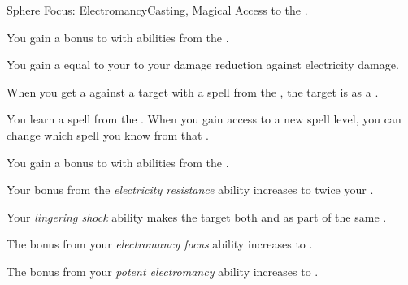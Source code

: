     \begin{feat}{Sphere Focus: Electromancy}{Casting, Magical}
        \featpre Access to the  .

         You gain a  bonus to  with abilities from the  .

         You gain a  equal to your  to your damage reduction against electricity damage.

         When you get a  against a target with a spell from the  , the target is  as a .

         You learn a spell from the  .
        When you gain access to a new spell level, you can change which spell you know from that .

         You gain a  bonus to  with abilities from the  .

         Your bonus from the \textit{electricity resistance} ability increases to twice your .

         Your \textit{lingering shock} ability makes the target both  and  as part of the same .

         The bonus from your \textit{electromancy focus} ability increases to .

         The bonus from your \textit{potent electromancy} ability increases to .
    \end{feat}

